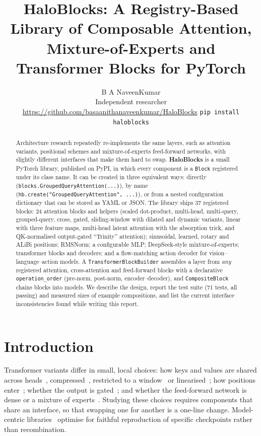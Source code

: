\documentclass[11pt]{article}
\title{\textbf{HaloBlocks: A Registry-Based Library of Composable Attention,\\Mixture-of-Experts and Transformer Blocks for PyTorch}}
\author{B A NaveenKumar\\
\small Independent researcher\\
\small \url{https://github.com/basaanithanaveenkumar/HaloBlocks} \quad \texttt{pip install haloblocks}}
\date{}
\begin{document}
\maketitle

\begin{abstract}
Architecture research repeatedly re-implements the same layers, such as attention variants,
positional schemes and mixture-of-experts feed-forward networks, with slightly different
interfaces that make them hard to swap. \textbf{HaloBlocks} is a small PyTorch library,
published on PyPI, in which every component is a \texttt{Block} registered under its class
name. It can be created in three equivalent ways: directly
(\texttt{blocks.GroupedQueryAttention(...)}), by name (\texttt{hb.create("GroupedQueryAttention",
...)}), or from a nested configuration dictionary that can be stored as YAML or JSON. The
library ships 37 registered blocks: 24 attention blocks and helpers (scaled dot-product, multi-head,
multi-query, grouped-query, cross, gated, sliding-window with dilated and dynamic variants,
linear with three feature maps, multi-head latent attention with the absorption trick, and
QK-normalised output-gated ``Trinity'' attention); sinusoidal, learned, rotary and ALiBi
positions; RMSNorm; a configurable MLP; DeepSeek-style mixture-of-experts; transformer blocks
and decoders; and a flow-matching action decoder for vision--language--action models. A
\texttt{TransformerBlockBuilder} assembles a layer from \emph{any} registered attention,
cross-attention and feed-forward blocks with a declarative \texttt{operation\_order} (pre-norm,
post-norm, encoder--decoder), and \texttt{CompositeBlock} chains blocks into models. We describe
the design, report the test suite (71 tests, all passing) and measured sizes of example
compositions, and list the current interface inconsistencies found while writing this report.
\end{abstract}

\section{Introduction}

Transformer variants differ in small, local choices: how keys and values are shared across
heads~\cite{shazeer2019mqa,ainslie2023gqa}, compressed~\cite{deepseekv2}, restricted to a
window~\cite{beltagy2020longformer} or linearised~\cite{katharopoulos2020linear}; how positions
enter~\cite{su2021roformer,press2022alibi}; whether the output is gated~\cite{qiu2025gated}; and
whether the feed-forward network is dense or a mixture of
experts~\cite{shazeer2017outrageously,dai2024deepseekmoe}. Studying these choices requires
components that share an interface, so that swapping one for another is a one-line change.
Model-centric libraries~\cite{wolf2020transformers} optimise for faithful reproduction of
specific checkpoints rather than recombination.
\end{document}
